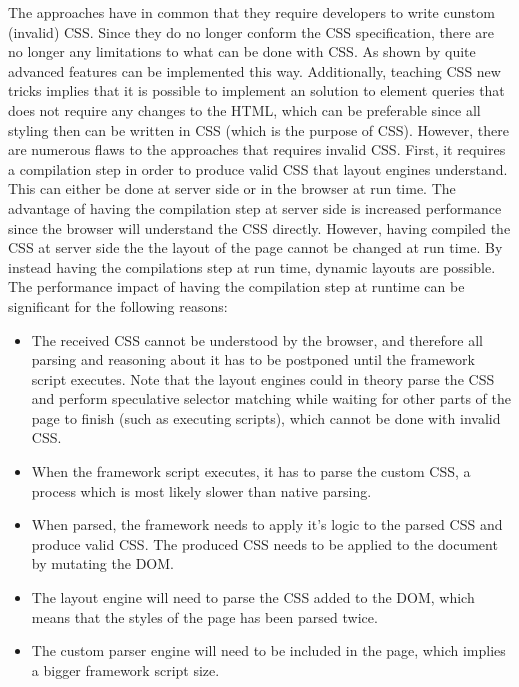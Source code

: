 \documentclass[a4paper,11pt]{kth-mag}
\begin{document}
      The approaches \cite{eq_imp_magichtml,eq_imp_eqcss,eq_imp_prollyfill-min-width,eq_imp_localised-css,eq_imp_gss} have in common that they require developers to write cunstom (invalid) \gls{CSS}.
      Since they do no longer conform the \gls{CSS} specification, there are no longer any limitations to what can be done with \gls{CSS}.
      As shown by \cite{eq_imp_eqcss,eq_imp_gss} quite advanced features can be implemented this way.
      Additionally, teaching \gls{CSS} new tricks implies that it is possible to implement an solution to element queries that does not require any changes to the \gls{HTML}, which can be preferable since all styling then can be written in \gls{CSS} (which is the purpose of \gls{CSS}).
      However, there are numerous flaws to the approaches that requires invalid \gls{CSS}.
      First, it requires a compilation step in order to produce valid \gls{CSS} that layout engines understand.
      This can either be done at server side or in the browser at run time.
      The advantage of having the compilation step at server side is increased performance since the browser will understand the \gls{CSS} directly.
      However, having compiled the \gls{CSS} at server side the the layout of the page cannot be changed at run time.
      By instead having the compilations step at run time, dynamic layouts are possible.
      The performance impact of having the compilation step at runtime can be significant for the following reasons:
      \begin{itemize}
        \item The received \gls{CSS} cannot be understood by the browser, and therefore all parsing and reasoning about it has to be postponed until the framework script executes.
        Note that the layout engines could in theory parse the \gls{CSS} and perform speculative selector matching while waiting for other parts of the page to finish (such as executing scripts), which cannot be done with invalid \gls{CSS}.
        \item When the framework script executes, it has to parse the custom \gls{CSS}, a process which is most likely slower than native parsing.
        \item When parsed, the framework needs to apply it's logic to the parsed \gls{CSS} and produce valid \gls{CSS}. The produced \gls{CSS} needs to be applied to the document by mutating the \gls{DOM}.
        \item The layout engine will need to parse the \gls{CSS} added to the \gls{DOM}, which means that the styles of the page has been parsed twice.
        \item The custom parser engine will need to be included in the page, which implies a bigger framework script size.
      \end{itemize}
\end{document}

